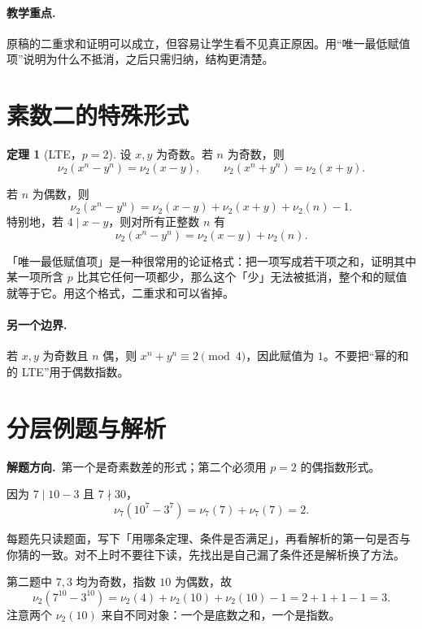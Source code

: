 \documentclass[UTF8,a4paper,11pt,twoside,openright,fontset=fandol]{ctexbook}
\theoremstyle{definition}
\newtheorem{theorem}[definition]{定理}
\newcommand{\hint}{\par\noindent\textbf{解题方向.}\ }
\begin{document}
\paragraph{教学重点.} 原稿的二重求和证明可以成立，但容易让学生看不见真正原因。用“唯一最低赋值项”说明为什么不抵消，之后只需归纳，结构更清楚。


\section{素数二的特殊形式}
\begin{theorem}[LTE，$p=2$]
设 $x,y$ 为奇数。若 $n$ 为奇数，则
\[
 \nu_2(x^n-y^n)=\nu_2(x-y),\qquad
 \nu_2(x^n+y^n)=\nu_2(x+y).
\]


若 $n$ 为偶数，则
\[
 \nu_2(x^n-y^n)=\nu_2(x-y)+\nu_2(x+y)+\nu_2(n)-1.
\]
特别地，若 $4\mid x-y$，则对所有正整数 $n$ 有
\[
 \nu_2(x^n-y^n)=\nu_2(x-y)+\nu_2(n).
\]
\end{theorem}

\begin{tip}[方法：唯一最低赋值项]
「唯一最低赋值项」是一种很常用的论证格式：把一项写成若干项之和，证明其中某一项所含 $p$ 比其它任何一项都少，那么这个「少」无法被抵消，整个和的赋值就等于它。用这个格式，二重求和可以省掉。
\end{tip}


\paragraph{另一个边界.} 若 $x,y$ 为奇数且 $n$ 偶，则 $x^n+y^n\equiv2\pmod4$，因此赋值为 $1$。不要把“幂的和的 LTE”用于偶数指数。


\section{分层例题与解析}
\hint 第一个是奇素数差的形式；第二个必须用 $p=2$ 的偶指数形式。

因为 $7\mid10-3$ 且 $7\nmid30$，
\[
 \nu_7(10^7-3^7)=\nu_7(7)+\nu_7(7)=2.
\]

\begin{tip}[怎么用一节里的例题]
每题先只读题面，写下「用哪条定理、条件是否满足」，再看解析的第一句是否与你猜的一致。对不上时不要往下读，先找出是自己漏了条件还是解析换了方法。
\end{tip}

第二题中 $7,3$ 均为奇数，指数 $10$ 为偶数，故
\[
 \nu_2(7^{10}-3^{10})=\nu_2(4)+\nu_2(10)+\nu_2(10)-1=2+1+1-1=3.
\]
注意两个 $\nu_2(10)$ 来自不同对象：一个是底数之和，一个是指数。
\end{document}
